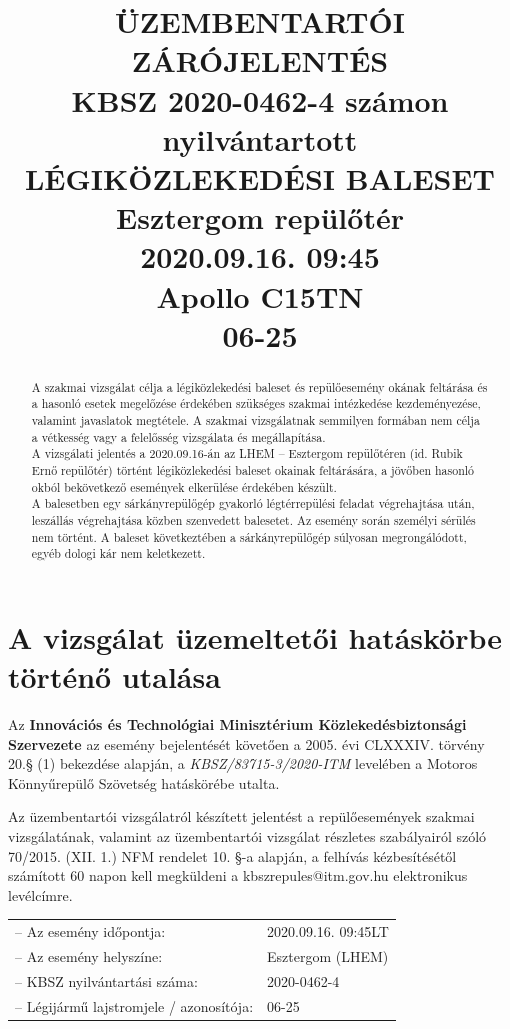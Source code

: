 \documentclass[a4paper,10pt]{article}
\title{%
    \textbf{ÜZEMBENTARTÓI ZÁRÓJELENTÉS} \\
    \vspace*{36pt}
    \textbf{KBSZ 2020-0462-4 számon nyilvántartott\\
    LÉGIKÖZLEKEDÉSI BALESET}\\
    \vspace*{24pt}
    Esztergom repülőtér\\
    \vspace*{24pt}
    2020.09.16. 09:45\\
    \vspace*{24pt}
    Apollo C15TN\\
    06-25\\
}
\author{}
\date{}
\begin{document}
\maketitle
\pagebreak

\tableofcontents
\pagebreak

\begin{abstract}
A szakmai vizsgálat célja a légiközlekedési baleset és repülőesemény 
okának feltárása és a hasonló esetek megelőzése érdekében szükséges szakmai 
intézkedése kezdeményezése, valamint javaslatok megtétele. A szakmai 
vizsgálatnak semmilyen formában nem célja a vétkesség vagy a felelősség 
vizsgálata és megállapítása.
\\

A vizsgálati jelentés a 2020.09.16-án az LHEM -- Esztergom repülőtéren (id. 
Rubik Ernő repülőtér) történt légiközlekedési baleset okainak feltárására, a 
jövőben hasonló okból bekövetkező események elkerülése érdekében készült.
\\

A balesetben egy sárkányrepülőgép gyakorló légtérrepülési feladat 
végrehajtása után, leszállás végrehajtása közben szenvedett balesetet. 
Az esemény során személyi sérülés nem történt. A baleset következtében a 
sárkányrepülőgép súlyosan megrongálódott, egyéb dologi kár nem keletkezett.
\\
\end{abstract}

\pagebreak


\section*{A vizsgálat üzemeltetői hatáskörbe történő utalása}
Az \textbf{Innovációs és Technológiai Minisztérium Közlekedésbiztonsági 
Szervezete} az esemény bejelentését követően a 2005. évi CLXXXIV. törvény 20.§ 
(1) bekezdése alapján, a \textit{KBSZ/83715-3/2020-ITM} levelében a 
Motoros Könnyűrepülő Szövetség hatáskörébe utalta.

Az üzembentartói vizsgálatról készített jelentést a repülőesemények szakmai 
vizsgálatának, valamint az üzembentartói vizsgálat részletes szabályairól szóló 
70/2015. (XII. 1.) NFM rendelet  10. §-a alapján, a felhívás kézbesítésétől 
számított 60 napon kell megküldeni a kbszrepules@itm.gov.hu elektronikus 
levélcímre.\\

\begin{tabular}{ll}
  -- Az esemény időpontja:& 2020.09.16. 09:45LT\\
  -- Az esemény helyszíne:& Esztergom (LHEM)\\
  -- KBSZ nyilvántartási száma:& 2020-0462-4\\
  -- Légijármű lajstromjele / azonosítója:& 06-25\\
\end{tabular}
\end{document}

